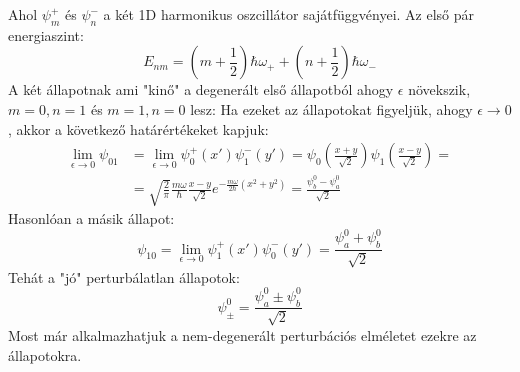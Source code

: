 \documentclass[../main.tex]{subfiles}
\begin{document}
Ahol $\psi_m^+$ és $\psi_n^-$ a két 1D harmonikus oszcillátor sajátfüggvényei. Az első pár energiaszint:
\begin{equation}
    E_{nm} = \left(m + \frac{1}{2}\right) \hbar \omega_+ + \left(n + \frac{1}{2}\right) \hbar \omega_-
\end{equation}
A két állapotnak ami "kinő" a degenerált első állapotból ahogy $\epsilon$ növekszik, $m=0,n=1$ és $m=1,n=0$ lesz: Ha ezeket az állapotokat figyeljük, ahogy $\epsilon \to 0$, akkor a következő határértékeket kapjuk:
\begin{equation}
    \begin{aligned}
        \lim_{\epsilon \to 0} \psi_{01} &= \lim_{\epsilon \to 0} \psi_0^+ (x') \psi_1^- (y') = \psi_0 \left(\frac{x + y}{\sqrt{2}}\right) \psi_1 \left(\frac{x - y}{\sqrt{2}}\right) = \\
        &= \sqrt{\frac{2}{\pi}} \frac{m \omega}{\hbar} \frac{x - y}{\sqrt{2}} e^{-\frac{m \omega}{2 \hbar} (x^2 + y^2)} = \frac{\psi_b^0 - \psi_a^0}{\sqrt{2}}
    \end{aligned}
\end{equation}
Hasonlóan a másik állapot:
\begin{equation}
    \psi_{10} = \lim_{\epsilon \to 0} \psi_1^+ (x') \psi_0^- (y') = \frac{\psi_a^0 + \psi_b^0}{\sqrt{2}}
\end{equation}
Tehát a "jó" perturbálatlan állapotok:
\begin{equation}
    \psi_\pm^0 = \frac{\psi_a^0 \pm \psi_b^0}{\sqrt{2}}
\end{equation}
Most már alkalmazhatjuk a nem-degenerált perturbációs elméletet ezekre az állapotokra. 
\end{document}
